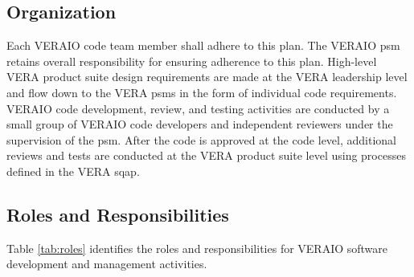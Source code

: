 \documentclass{vera-ornltm}
\begin{document}
\subsection{Organization}

Each VERAIO code team member shall adhere to this plan.
The VERAIO \ac{psm} retains overall responsibility for ensuring adherence to this plan.
High-level VERA product suite design requirements are made at the VERA leadership level and flow down to the VERA \acp{psm} in the form of individual code requirements.
VERAIO code development, review, and testing activities are conducted by a small group of VERAIO code developers and independent reviewers under the supervision of the \ac{psm}.
After the code is approved at the code level, additional reviews and tests are conducted at the VERA product suite level using processes defined in the VERA \ac{sqap}.

\subsection{Roles and Responsibilities}

Table \ref{tab:roles} identifies the roles and responsibilities for VERAIO software development and management activities.
\end{document}
